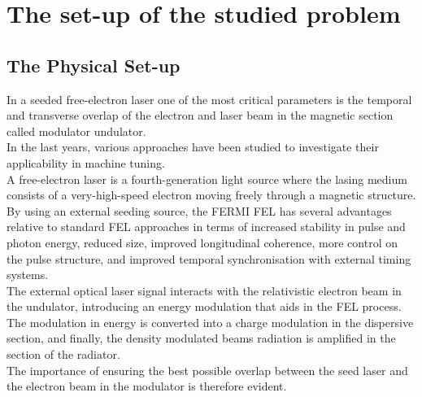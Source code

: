 \documentclass[
reprint,nofootinbib,
amsmath,amssymb,amsfonts,clevref,
aps,
prstab,
]{revtex4-2}
\begin{document}
	
	\section{The set-up of the studied problem}
	\subsection{The Physical Set-up}
	In a seeded free-electron laser one of the most critical parameters is the temporal and transverse overlap of the electron and laser beam in the magnetic section called modulator undulator.\\
	In the last years, various approaches have been studied to investigate their applicability in machine tuning. \\
	A free-electron laser is a fourth-generation light source where the lasing medium consists of a very-high-speed electron moving freely through a magnetic structure. By using an external seeding source, the FERMI FEL has several advantages relative to standard FEL approaches in terms of increased stability in pulse and photon energy, reduced size, improved longitudinal coherence, more control on the pulse structure, and improved temporal synchronisation with external timing systems.\\
	The external optical laser signal interacts with the relativistic electron beam in the undulator, introducing an energy modulation that aids in the FEL process. The modulation in energy is converted into a charge modulation in the dispersive section, and finally, the density modulated beams radiation is amplified in the section of the radiator.\\
	The importance of ensuring the best possible overlap between the seed laser and the electron beam in the modulator is therefore evident.\\
\end{document}
